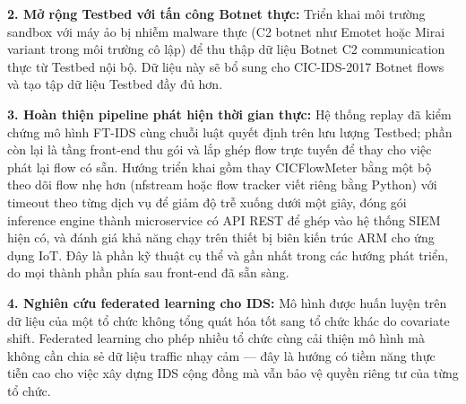 \documentclass[../DoAn.tex]{subfiles}
\begin{document}
\textbf{2. Mở rộng Testbed với tấn công Botnet thực:} Triển khai môi trường sandbox với máy ảo bị nhiễm malware thực (C2 botnet như Emotet hoặc Mirai variant trong môi trường cô lập) để thu thập dữ liệu Botnet C2 communication thực từ Testbed nội bộ. Dữ liệu này sẽ bổ sung cho CIC-IDS-2017 Botnet flows và tạo tập dữ liệu Testbed đầy đủ hơn.

\textbf{3. Hoàn thiện pipeline phát hiện thời gian thực:} Hệ thống replay đã kiểm chứng mô hình FT-IDS cùng chuỗi luật quyết định trên lưu lượng Testbed; phần còn lại là tầng front-end thu gói và lắp ghép flow trực tuyến để thay cho việc phát lại flow có sẵn. Hướng triển khai gồm thay CICFlowMeter bằng một bộ theo dõi flow nhẹ hơn (nfstream hoặc flow tracker viết riêng bằng Python) với timeout theo từng dịch vụ để giảm độ trễ xuống dưới một giây, đóng gói inference engine thành microservice có API REST để ghép vào hệ thống SIEM hiện có, và đánh giá khả năng chạy trên thiết bị biên kiến trúc ARM cho ứng dụng IoT. Đây là phần kỹ thuật cụ thể và gần nhất trong các hướng phát triển, do mọi thành phần phía sau front-end đã sẵn sàng.

\textbf{4. Nghiên cứu federated learning cho IDS:} Mô hình được huấn luyện trên dữ liệu của một tổ chức không tổng quát hóa tốt sang tổ chức khác do covariate shift. Federated learning cho phép nhiều tổ chức cùng cải thiện mô hình mà không cần chia sẻ dữ liệu traffic nhạy cảm --- đây là hướng có tiềm năng thực tiễn cao cho việc xây dựng IDS cộng đồng mà vẫn bảo vệ quyền riêng tư của từng tổ chức.
\end{document}
